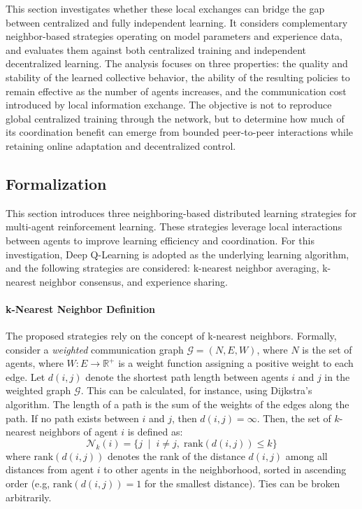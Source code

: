 This section investigates whether these local exchanges can bridge the gap 
 between centralized and fully independent learning.
%
It considers complementary neighbor-based strategies operating on model parameters
 and experience data, and evaluates them against both centralized training 
 and independent decentralized learning.
%
The analysis focuses on three properties: 
 the quality and stability of the learned collective behavior, 
 the ability of the resulting policies to remain effective as the number of agents increases, 
 and the communication cost introduced by local information exchange.
%
The objective is not to reproduce global centralized training through the network,
 but to determine how much of its coordination benefit can emerge from bounded
 peer-to-peer interactions while retaining online adaptation and decentralized control.


\subsection{Formalization}\label{sec:neighboring}
This section introduces three neighboring-based distributed learning strategies 
 for multi-agent reinforcement learning.
%
These strategies leverage local interactions between agents 
 to improve learning efficiency and coordination.
%
For this investigation, 
 Deep Q-Learning is adopted as the underlying learning algorithm,
 and the following strategies are considered: 
 k-nearest neighbor averaging, k-nearest neighbor consensus, and experience sharing.

\paragraph{k-Nearest Neighbor Definition}
The proposed strategies rely on the concept of k-nearest neighbors.
%
Formally, 
 consider a \emph{weighted} communication graph $\mathcal{G} = (N, E, W)$, 
 where $N$ is the set of agents, 
 where $W: E \rightarrow \mathbb{R}^+$ is a weight function assigning a positive weight to each edge.  
%
Let $d(i,j)$ denote the shortest path length between agents $i$ 
 and $j$ in the weighted graph $\mathcal{G}$. 
%
This can be calculated, 
 for instance, using Dijkstra's algorithm. 
%
The length of a path is the sum of the weights of the edges along the path. 
%
If no path exists between $i$ and $j$, then $d(i,j) = \infty$.
%
Then, 
 the set of $k$-nearest neighbors of agent $i$ is defined as:
\begin{equation}
  \mathcal{N}_k(i) = \{ j \; \mid \; i \neq j, \; \text{rank}(d(i,j)) \leq k \}
\end{equation}
  where $\text{rank}(d(i,j))$ denotes the rank of the distance $d(i,j)$ among all distances from agent $i$ to other agents in the neighborhood, sorted in ascending order (e.g, $\text{rank}(d(i,j)) = 1$ for the smallest distance).
Ties can be broken arbitrarily.

